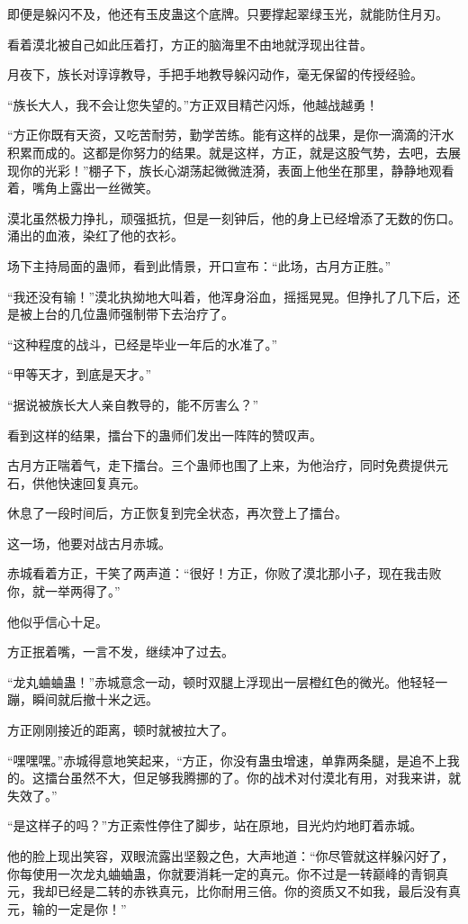 \begin{this_body}
即便是躲闪不及，他还有玉皮蛊这个底牌。只要撑起翠绿玉光，就能防住月刃。

看着漠北被自己如此压着打，方正的脑海里不由地就浮现出往昔。

月夜下，族长对谆谆教导，手把手地教导躲闪动作，毫无保留的传授经验。

“族长大人，我不会让您失望的。”方正双目精芒闪烁，他越战越勇！

“方正你既有天资，又吃苦耐劳，勤学苦练。能有这样的战果，是你一滴滴的汗水积累而成的。这都是你努力的结果。就是这样，方正，就是这股气势，去吧，去展现你的光彩！”棚子下，族长心湖荡起微微涟漪，表面上他坐在那里，静静地观看着，嘴角上露出一丝微笑。

漠北虽然极力挣扎，顽强抵抗，但是一刻钟后，他的身上已经增添了无数的伤口。涌出的血液，染红了他的衣衫。

场下主持局面的蛊师，看到此情景，开口宣布：“此场，古月方正胜。”

“我还没有输！”漠北执拗地大叫着，他浑身浴血，摇摇晃晃。但挣扎了几下后，还是被上台的几位蛊师强制带下去治疗了。

“这种程度的战斗，已经是毕业一年后的水准了。”

“甲等天才，到底是天才。”

“据说被族长大人亲自教导的，能不厉害么？”

看到这样的结果，擂台下的蛊师们发出一阵阵的赞叹声。

古月方正喘着气，走下擂台。三个蛊师也围了上来，为他治疗，同时免费提供元石，供他快速回复真元。

休息了一段时间后，方正恢复到完全状态，再次登上了擂台。

这一场，他要对战古月赤城。

赤城看着方正，干笑了两声道：“很好！方正，你败了漠北那小子，现在我击败你，就一举两得了。”

他似乎信心十足。

方正抿着嘴，一言不发，继续冲了过去。

“龙丸蛐蛐蛊！”赤城意念一动，顿时双腿上浮现出一层橙红色的微光。他轻轻一蹦，瞬间就后撤十米之远。

方正刚刚接近的距离，顿时就被拉大了。

“嘿嘿嘿。”赤城得意地笑起来，“方正，你没有蛊虫增速，单靠两条腿，是追不上我的。这擂台虽然不大，但足够我腾挪的了。你的战术对付漠北有用，对我来讲，就失效了。”

“是这样子的吗？”方正索性停住了脚步，站在原地，目光灼灼地盯着赤城。

他的脸上现出笑容，双眼流露出坚毅之色，大声地道：“你尽管就这样躲闪好了，你每使用一次龙丸蛐蛐蛊，你就要消耗一定的真元。你不过是一转巅峰的青铜真元，我却已经是二转的赤铁真元，比你耐用三倍。你的资质又不如我，最后没有真元，输的一定是你！”


\end{this_body}
